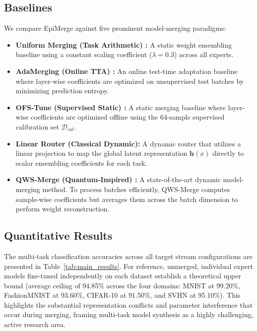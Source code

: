 \subsection{Baselines}
We compare EpiMerge against five prominent model-merging paradigms:
\begin{itemize}
    \item \textbf{Uniform Merging (Task Arithmetic) \cite{task_arithmetic}:} A static weight ensembling baseline using a constant scaling coefficient ($\lambda = 0.3$) across all experts.
    \item \textbf{AdaMerging (Online TTA) \cite{adamerging}:} An online test-time adaptation baseline where layer-wise coefficients are optimized on unsupervised test batches by minimizing prediction entropy.
    \item \textbf{OFS-Tune (Supervised Static) \cite{ofstune}:} A static merging baseline where layer-wise coefficients are optimized offline using the 64-sample supervised calibration set $\mathcal{D}_{cal}$.
    \item \textbf{Linear Router (Classical Dynamic):} A dynamic router that utilizes a linear projection to map the global latent representation $\mathbf{h}(x)$ directly to scalar ensembling coefficients for each task.
    \item \textbf{QWS-Merge (Quantum-Inspired) \cite{qws_merge}:} A state-of-the-art dynamic model-merging method. To process batches efficiently, QWS-Merge computes sample-wise coefficients but averages them across the batch dimension to perform weight reconstruction.
\end{itemize}

\subsection{Quantitative Results}

The multi-task classification accuracies across all target stream configurations are presented in Table~\ref{tab:main_results}. For reference, unmerged, individual expert models fine-tuned independently on each dataset establish a theoretical upper bound (average ceiling of 94.85\% across the four domains: MNIST at 99.20\%, FashionMNIST at 93.60\%, CIFAR-10 at 91.50\%, and SVHN at 95.10\%). This highlights the substantial representation conflicts and parameter interference that occur during merging, framing multi-task model synthesis as a highly challenging, active research area.

